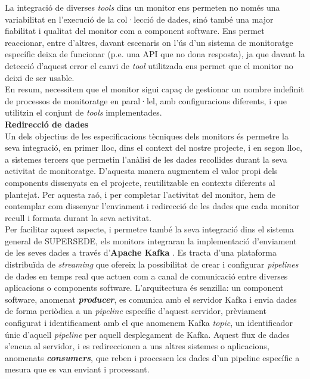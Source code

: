 La integració de diverses \textit{tools} dins un monitor ens permeten no només una variabilitat en l'execució de la col·lecció de dades, sinó també una major fiabilitat i qualitat del monitor com a component software. Ens permet reaccionar, entre d'altres, davant escenaris on l'ús d'un sistema de monitoratge específic deixa de funcionar (p.e. una API que no dona resposta), ja que davant la detecció d'aquest error el canvi de \textit{tool} utilitzada ens permet que el monitor no deixi de ser usable.\\

En resum, necessitem que el monitor sigui capaç de gestionar un nombre indefinit de processos de monitoratge en paral·lel, amb configuracions diferents, i que utilitzin el conjunt de \textit{tools} implementades.\\

\noindent \textbf{\large Redirecció de dades}\\

\noindent Un dels objectius de les especificacions tècniques dels monitors és permetre la seva integració, en primer lloc, dins el context del nostre projecte, i en segon lloc, a sistemes tercers que permetin l'anàlisi de les dades recollides durant la seva activitat de monitoratge. D'aquesta manera augmentem el valor propi dels components dissenyats en el projecte, reutilitzable en contexts diferents al plantejat. Per aquesta raó, i per completar l'activitat del monitor, hem de contemplar com dissenyar l'enviament i redirecció de les dades que cada monitor recull i formata durant la seva activitat. \\

Per facilitar aquest aspecte, i permetre també la seva integració dins el sistema general de SUPERSEDE, els monitors integraran la implementació d'enviament de les seves dades a través d'\textbf{Apache Kafka} \cite{kafka}. Es tracta d'una plataforma distribuïda de \textit{streaming} que ofereix la possibilitat de crear i configurar \textit{pipelines} de dades en temps real que actuen com a canal de comunicació entre diverses aplicacions o components software. L'arquitectura és senzilla: un component software, anomenat \textbf{\textit{producer}}, es comunica amb el servidor Kafka i envia dades de forma periòdica a un \textit{pipeline} específic d'aquest servidor, prèviament configurat i identificament amb el que anomenem Kafka \textit{topic}, un identificador únic d'aquell \textit{pipeline} per aquell desplegament de Kafka. Aquest flux de dades s'encua al servidor, i es redireccionen a uns altres sistemes o aplicacions, anomenats \textbf{\textit{consumers}}, que reben i processen les dades d'un pipeline específic a mesura que es van enviant i processant.\\

